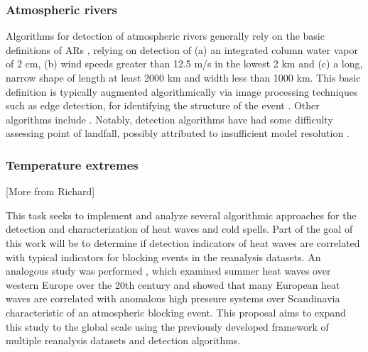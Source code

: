 \documentclass[11pt]{article}
\begin{document}

\subsubsection{Atmospheric rivers}

Algorithms for detection of atmospheric rivers generally rely on the basic definitions of ARs \citep{ralph2011storms}, relying on detection of (a) an integrated column water vapor of 2 cm, (b) wind speeds greater than 12.5 m/s in the lowest 2 km and (c) a long, narrow shape of length at least 2000 km and width less than 1000 km.  This basic definition is typically augmented algorithmically via image processing techniques such as edge detection, for identifying the structure of the event \citep{wick2013description}.  Other algorithms include \cite{zhu1998proposed, bao2006interpretation, dirmeyer2007characterization, gimeno2010origin, lavers2012detection}.   Notably, detection algorithms have had some difficulty assessing point of landfall, possibly attributed to insufficient model resolution \citep{wick2014implementation}.


\subsubsection{Temperature extremes}

{\color{red}[More from Richard]}

This task seeks to implement and analyze several algorithmic approaches for the detection and characterization of heat waves and cold spells.  Part of the goal of this work will be to determine if detection indicators of heat waves are correlated with typical indicators for blocking events in the reanalysis datasets.  An analogous study was performed \cite{della2007summer}, which examined summer heat waves over western Europe over the 20th century and showed that many European heat waves are correlated with anomalous high pressure systems over Scandinavia characteristic of an atmospheric blocking event.  This proposal aims to expand this study to the global scale using the previously developed framework of multiple reanalysis datasets and detection algorithms.
\end{document}
